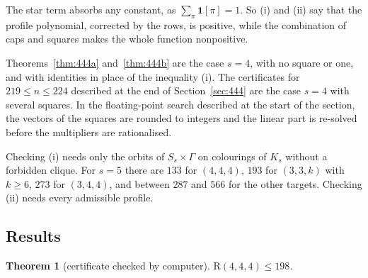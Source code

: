 \documentclass[11pt]{article}
\theoremstyle{spacedplain}
\newtheorem{theorem}{Theorem}[section]
\theoremstyle{spaceddef}
\theoremstyle{spacedremark}
\newcommand{\R}{\mathrm{R}}
\begin{document}
The star term absorbs any constant, as $\sum_\pi\mathbf 1[\pi]=1$.
So (i) and (ii) say that the profile polynomial, corrected by the rows, is positive, while the combination of caps and squares makes the whole function nonpositive.

Theorems~\ref{thm:444a} and~\ref{thm:444b} are the case $s=4$, with no square or one, and with identities in place of the inequality (i).
The certificates for $219\le n\le 224$ described at the end of Section~\ref{sec:444} are the case $s=4$ with several squares.
In the floating-point search described at the start of the section, the vectors of the squares are rounded to integers and the linear part is re-solved before the multipliers are rationalised.

Checking (i) needs only the orbits of $S_s\times\Gamma$ on colourings of $K_s$ without a forbidden clique.
For $s=5$ there are $133$ for $(4,4,4)$, $193$ for $(3,3,k)$ with $k\ge 6$, $273$ for $(3,4,4)$, and between $287$ and $566$ for the other targets.
Checking (ii) needs every admissible profile.

\subsection{Results}

\begin{theorem}[certificate checked by computer]\label{thm:r444five}
$\R(4,4,4)\le 198$.
\end{theorem}
\end{document}

